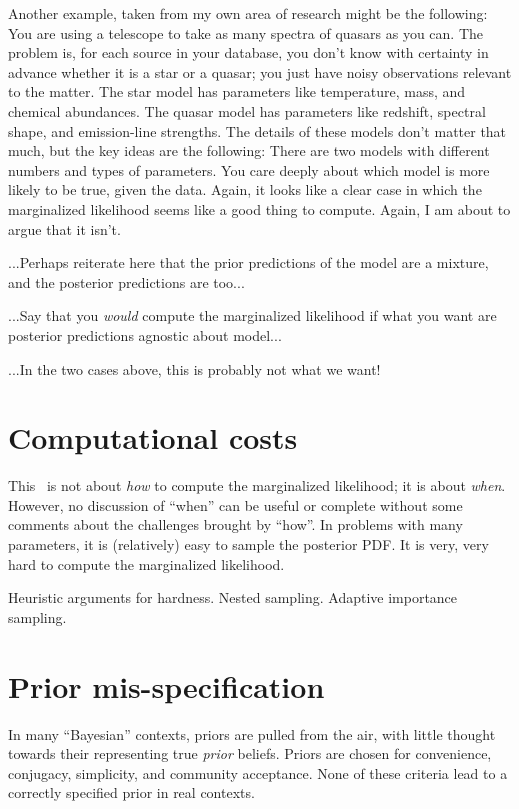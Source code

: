 \documentclass[12pt,twoside]{article}
\begin{document}
Another example, taken from my own area of research might be the following:
You are using a telescope to take as many spectra of quasars as you can.
The problem is, for each source in your database,
  you don't know with certainty in advance whether it is a star or a quasar;
  you just have noisy observations relevant to the matter.
The star model has parameters like temperature, mass, and chemical abundances.
The quasar model has parameters like redshift, spectral shape, and emission-line strengths.
The details of these models don't matter that much, but the key ideas are the following:
There are two models with different numbers and types of parameters.
You care deeply about which model is more likely to be true, given the data.
Again, it looks like a clear case in which the marginalized likelihood seems like a good thing to compute.
Again, I am about to argue that it isn't.

...Perhaps reiterate here that the prior predictions of the model are a mixture,
  and the posterior predictions are too...

...Say that you \emph{would} compute the marginalized likelihood if what you want
  are posterior predictions agnostic about model...

...In the two cases above, this is probably not what we want!

\section{Computational costs}

This \documentname\ is not about \emph{how} to compute the marginalized likelihood;
  it is about \emph{when}.
However, no discussion of ``when'' can be useful or complete without some comments
  about the challenges brought by ``how''.
In problems with many parameters, it is (relatively) easy to sample the posterior PDF.
It is very, very hard to compute the marginalized likelihood.

Heuristic arguments for hardness.
Nested sampling.
Adaptive importance sampling.

\section{Prior mis-specification}

In many ``Bayesian'' contexts, priors are pulled from the air,
  with little thought towards their representing true \emph{prior} beliefs.
Priors are chosen for convenience, conjugacy, simplicity, and community acceptance.
None of these criteria lead to a correctly specified prior in real contexts.
\end{document}
